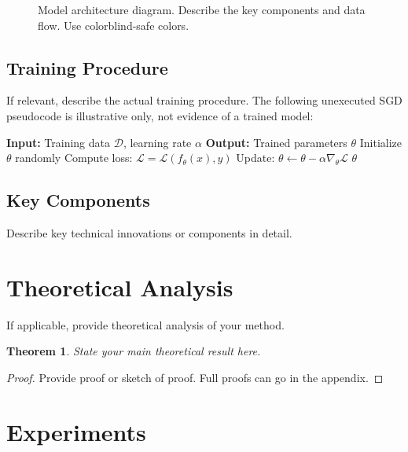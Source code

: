 \documentclass{article}
\newtheorem{theorem}{Theorem}
\begin{document}
\begin{figure}[t]
\centering
\caption{Model architecture diagram. Describe the key components and data flow. Use colorblind-safe colors.}
\label{fig:architecture}
\end{figure}

\subsection{Training Procedure}
If relevant, describe the actual training procedure. The following unexecuted SGD pseudocode is illustrative only, not evidence of a trained model:
\begin{algorithm}[t]
\caption{Training Algorithm}
\label{alg:training}
\begin{algorithmic}[1]
\STATE \textbf{Input:} Training data $\mathcal{D}$, learning rate $\alpha$
\STATE \textbf{Output:} Trained parameters $\theta$
\STATE Initialize $\theta$ randomly
        \STATE Compute loss: $\mathcal{L} = \mathcal{L}(f_\theta(x), y)$
        \STATE Update: $\theta \leftarrow \theta - \alpha \nabla_\theta \mathcal{L}$
    \ENDFOR
\ENDFOR
\RETURN $\theta$
\end{algorithmic}
\end{algorithm}

\subsection{Key Components}
Describe key technical innovations or components in detail.

\section{Theoretical Analysis}
\label{sec:theory}

If applicable, provide theoretical analysis of your method.

\begin{theorem}
\label{thm:main}
State your main theoretical result here.
\end{theorem}

\begin{proof}
Provide proof or sketch of proof. Full proofs can go in the appendix.
\end{proof}

\section{Experiments}
\label{sec:experiments}
\end{document}
